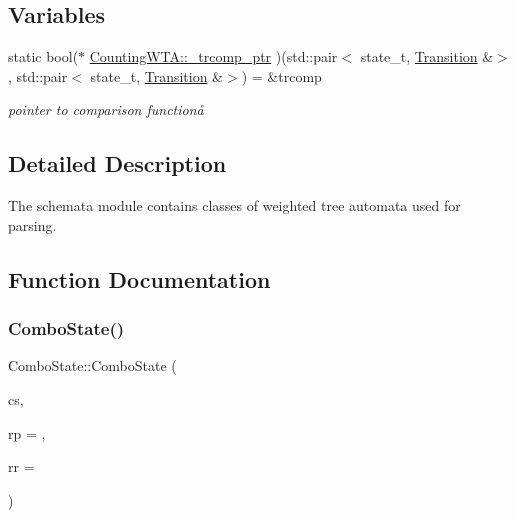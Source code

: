 \subsection*{Variables}
\begin{DoxyCompactItemize}
\item 
\mbox{\label{group__schemata_ga170bee814ca8089ab27a574b1f47281c}} 
static bool($\ast$ \mbox{\hyperlink{group__schemata_ga170bee814ca8089ab27a574b1f47281c}{Counting\+W\+T\+A\+::\+\_\+trcomp\+\_\+ptr}} )(std\+::pair$<$ state\+\_\+t, \mbox{\hyperlink{classTransition}{Transition}} \&$>$, std\+::pair$<$ state\+\_\+t, \mbox{\hyperlink{classTransition}{Transition}} \&$>$) = \&trcomp
\begin{DoxyCompactList}\small\item\em pointer to comparison functionå \end{DoxyCompactList}\end{DoxyCompactItemize}


\subsection{Detailed Description}
The {\ttfamily schemata} module contains classes of weighted tree automata used for parsing. 



\subsection{Function Documentation}
\mbox{\label{group__schemata_gad80378e34fdc145bd7f0dac17c306e39}} 
\subsubsection{\texorpdfstring{ComboState()}{ComboState()}}
{\footnotesize\ttfamily Combo\+State\+::\+Combo\+State (\begin{DoxyParamCaption}\item[{const \mbox{\hyperlink{classComboState}{Combo\+State}} \&}]{cs,  }\item[{\mbox{\hyperlink{group__general_ga092fe8b972dfa977c2a0886720a7731e}{pre\+\_\+t}}}]{rp = {},  }\item[{\mbox{\hyperlink{group__general_ga092fe8b972dfa977c2a0886720a7731e}{pre\+\_\+t}}}]{rr = {} }\end{DoxyParamCaption})}

